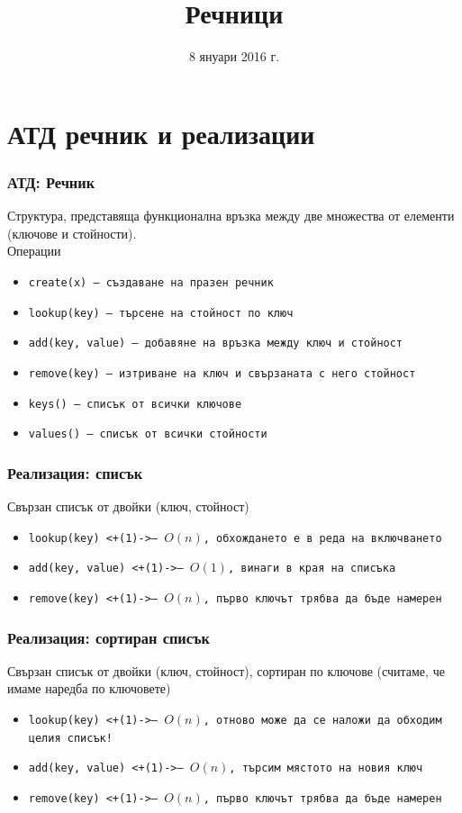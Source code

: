 \documentclass{beamer}
\title{Речници}
\date{8 януари 2016 г.}
\begin{document}
\begin{frame}
  \titlepage
\end{frame}

\section{АТД речник и реализации}

\begin{frame}
  \frametitle{АТД: Речник}
  Структура, представяща функционална връзка между две множества от елементи (ключове и стойности).\\[1em]
  \pause
  Операции
  \begin{itemize}
  \item \tt{create(x)} --- създаване на празен речник
  \item \tt{lookup(key)} --- търсене на стойност по ключ
  \item \tt{add(key, value)} --- добавяне на връзка между ключ и стойност
  \item \tt{remove(key)} --- изтриване на ключ и свързаната с него стойност
  \item \tt{keys()} --- списък от всички ключове
  \item \tt{values()} --- списък от всички стойности
  \end{itemize}
\end{frame}

\begin{frame}
  \frametitle{Реализация: списък}
  Свързан списък от двойки (ключ, стойност)
  \pause
  \begin{itemize}
  \item \tt{lookup(key)} \onslide<+(1)->{--- $O(n)$, обхождането е в реда на включването}
  \item \tt{add(key, value)} \onslide<+(1)->{--- $O(1)$, винаги в края на списъка}
  \item \tt{remove(key)} \onslide<+(1)->{--- $O(n)$, първо ключът трябва да бъде намерен}
  \end{itemize}
\end{frame}

\begin{frame}
  \frametitle{Реализация: сортиран списък}
  Свързан списък от двойки (ключ, стойност), сортиран по ключове (считаме, че имаме наредба по ключовете)
  \pause
  \begin{itemize}
  \item \tt{lookup(key)} \onslide<+(1)->{--- $O(n)$, отново може да се наложи да обходим целия списък!}
  \item \tt{add(key, value)} \onslide<+(1)->{--- \alert{$O(n)$}, търсим мястото на новия ключ}
  \item \tt{remove(key)} \onslide<+(1)->{--- $O(n)$, първо ключът трябва да бъде намерен}
  \end{itemize}
\end{frame}
\end{document}
